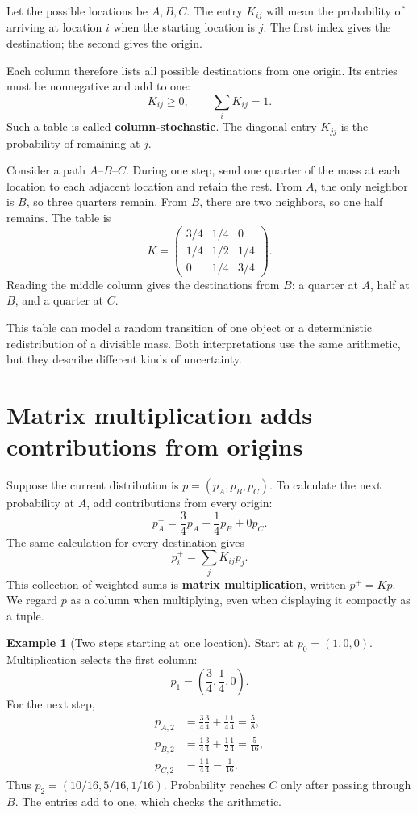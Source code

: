 \documentclass[11pt,oneside,openany]{book}
\theoremstyle{definition}
\newtheorem{example}{Example}[chapter]
\theoremstyle{remark}
\numberwithin{equation}{chapter}
\begin{document}
Let the possible locations be \(A,B,C\). The entry \(K_{ij}\) will mean the probability of arriving at location \(i\) when the starting location is \(j\). The first index gives the destination; the second gives the origin.

Each column therefore lists all possible destinations from one origin. Its entries must be nonnegative and add to one: \[K_{ij}\geq0,\qquad \sum_i K_{ij}=1.\] Such a table is called \textbf{column-stochastic}. The diagonal entry \(K_{jj}\) is the probability of remaining at \(j\).

Consider a path \(A\)--\(B\)--\(C\). During one step, send one quarter of the mass at each location to each adjacent location and retain the rest. From \(A\), the only neighbor is \(B\), so three quarters remain. From \(B\), there are two neighbors, so one half remains. The table is \[K=\begin{pmatrix}
3/4&1/4&0\\
1/4&1/2&1/4\\
0&1/4&3/4
\end{pmatrix}.\] Reading the middle column gives the destinations from \(B\): a quarter at \(A\), half at \(B\), and a quarter at \(C\).

This table can model a random transition of one object or a deterministic redistribution of a divisible mass. Both interpretations use the same arithmetic, but they describe different kinds of uncertainty.

\section{Matrix multiplication adds contributions from origins}\label{ch04-matrix-multiplication-adds-contributions-from-origins}

Suppose the current distribution is \(p=(p_A,p_B,p_C)\). To calculate the next probability at \(A\), add contributions from every origin: \[p_A^+=\frac34p_A+\frac14p_B+0p_C.\] The same calculation for every destination gives \[p_i^+=\sum_j K_{ij}p_j.\] This collection of weighted sums is \textbf{matrix multiplication}, written \(p^+=Kp\). We regard \(p\) as a column when multiplying, even when displaying it compactly as a tuple.

\begin{example}[Two steps starting at one location]

Start at \(p_0=(1,0,0)\). Multiplication selects the first column: \[p_1=\left(\frac34,\frac14,0\right).\] For the next step, \[\begin{aligned}
p_{A,2}&=\frac34\frac34+\frac14\frac14=\frac58,\\
p_{B,2}&=\frac14\frac34+\frac12\frac14=\frac5{16},\\
p_{C,2}&=\frac14\frac14=\frac1{16}.
\end{aligned}\] Thus \(p_2=(10/16,5/16,1/16)\). Probability reaches \(C\) only after passing through \(B\). The entries add to one, which checks the arithmetic.

\end{example}
\end{document}
